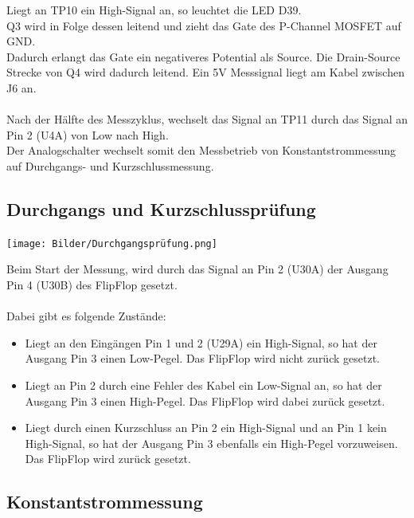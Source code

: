 Liegt an TP10 ein High-Signal an, so leuchtet die LED D39.
\\
Q3 wird in Folge dessen leitend und zieht das Gate des P-Channel MOSFET auf GND. 
\\
Dadurch erlangt das Gate ein negativeres Potential als Source. Die Drain-Source Strecke von Q4 wird dadurch leitend. Ein 5V Messsignal liegt am Kabel zwischen J6 an. 
\\
\\
Nach der Hälfte des Messzyklus, wechselt das Signal an TP11 durch das Signal an Pin 2 (U4A) von Low nach High. 
\\
Der Analogschalter wechselt somit den Messbetrieb von Konstantstrommessung auf Durchgangs- und Kurzschlussmessung.

\newpage
\subsection{Durchgangs und Kurzschlussprüfung}

\begin{center}
\texttt{[image: Bilder/Durchgangsprüfung.png]}
\end{center}

Beim Start der Messung, wird durch das Signal an Pin 2 (U30A) der Ausgang Pin 4 (U30B) des FlipFlop gesetzt. 
\\
\\
Dabei gibt es folgende Zustände:

\begin{itemize}
	\item{Liegt an den Eingängen Pin 1 und 2 (U29A) ein High-Signal,  so hat der Ausgang Pin 3 einen Low-Pegel. Das FlipFlop wird nicht zurück gesetzt.}
	
	\item{Liegt an Pin 2 durch eine Fehler des Kabel ein Low-Signal an, so hat der Ausgang Pin 3 einen High-Pegel. Das FlipFlop wird dabei zurück gesetzt.}
	
	\item{Liegt durch einen Kurzschluss an Pin 2 ein High-Signal und an Pin 1 kein High-Signal, so hat der Ausgang Pin 3 ebenfalls ein High-Pegel vorzuweisen. Das FlipFlop wird zurück gesetzt.}
\end{itemize}

\newpage
\subsection{Konstantstrommessung}

